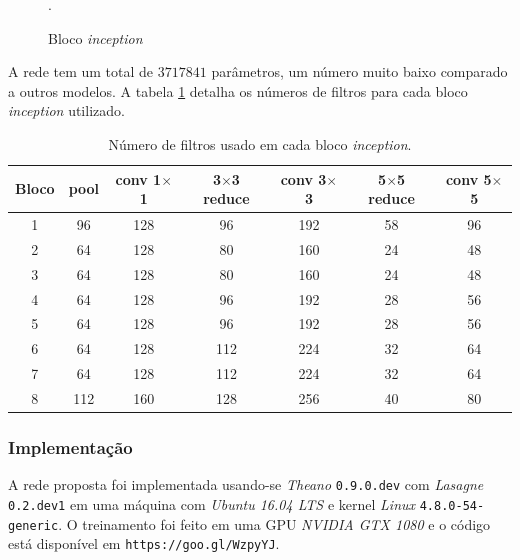 \documentclass[11pt]{article}
\newcommand{\tit}[1]{\textit{#1}}
\begin{document}
\begin{figure}[H]
    \centering
    \def\svgwidth{0.57\linewidth}
    
    \caption{Bloco \tit{inception}}.
   \label{fig:newinception}
\end{figure}

A rede tem um total de $3717841$ parâmetros, um número muito baixo comparado
a outros modelos.
A tabela \ref{table:inception} detalha os números de filtros para cada
bloco \tit{inception} utilizado.

\begin{table}[H]
\centering
	\small
\label{table:inception}
\caption{Número de filtros usado em cada bloco \tit{inception}.}
\begin{tabular}{|c|c|c|c|c|c|c|}
	\hline
    Bloco & pool & conv 1$\times$1 & 3$\times$3 reduce &
    conv 3$\times$3 & 5$\times$5 reduce & conv 5$\times$5\\
    \hline
    1 & 96 & 128 & 96 & 192 & 58 & 96\\
    \hline
    2 & 64 & 128 & 80 & 160 & 24 & 48\\
    \hline
    3 & 64 & 128 & 80 & 160 & 24 & 48\\
    \hline
    4 & 64 & 128 & 96 & 192 & 28 & 56\\
    \hline
    5 & 64 & 128 & 96 & 192 & 28 & 56\\
    \hline
    6 & 64 & 128 & 112 & 224 & 32 & 64\\
    \hline
    7 & 64 & 128 & 112 & 224 & 32 & 64\\
    \hline
    8 & 112 & 160 & 128 & 256 & 40 & 80\\
    \hline
\end{tabular}
\end{table}

\subsubsection{Implementação}
A rede proposta foi implementada usando-se \emph{Theano} \texttt{0.9.0.dev}
com \emph{Lasagne} \texttt{0.2.dev1}
em uma máquina com \emph{Ubuntu 16.04 LTS} e
kernel \emph{Linux} \texttt{4.8.0-54-generic}.
O treinamento foi feito em uma GPU \emph{NVIDIA GTX 1080} e o código está
disponível em \texttt{https://goo.gl/WzpyYJ}.
\end{document}
